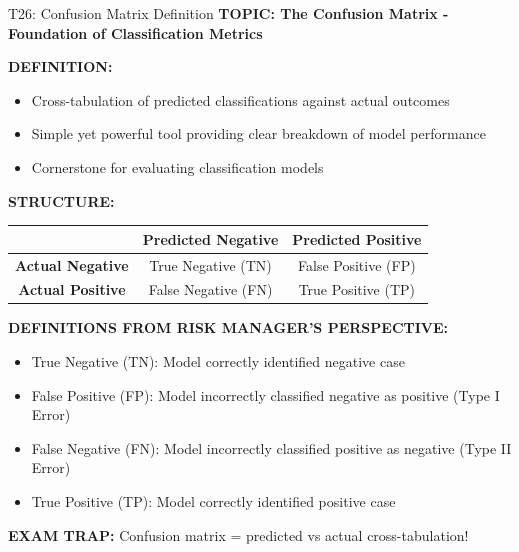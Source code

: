 \documentclass[8pt]{beamer}
\begin{document}
	\begin{frame}{T26: Confusion Matrix Definition}
		\fontsize{6.5}{7.5}\selectfont
		\textbf{TOPIC: The Confusion Matrix - Foundation of Classification Metrics}
		
		\vspace{0.1cm}
		\textbf{DEFINITION:}
		\begin{itemize}
			\item Cross-tabulation of predicted classifications against actual outcomes
			\item Simple yet powerful tool providing clear breakdown of model performance
			\item Cornerstone for evaluating classification models
		\end{itemize}
		
		\vspace{0.1cm}
		\textbf{STRUCTURE:}
		
		\begin{tabular}{|c|c|c|}
			\hline
			& \textbf{Predicted Negative} & \textbf{Predicted Positive} \\
			\hline
			\textbf{Actual Negative} & True Negative (TN) & False Positive (FP) \\
			\hline
			\textbf{Actual Positive} & False Negative (FN) & True Positive (TP) \\
			\hline
		\end{tabular}
		
		\vspace{0.1cm}
		\textbf{DEFINITIONS FROM RISK MANAGER'S PERSPECTIVE:}
		\begin{itemize}
			\item \textcolor{myblue}{True Negative (TN):} Model correctly identified negative case
			\item \textcolor{myblue}{False Positive (FP):} Model incorrectly classified negative as positive (Type I Error)
			\item \textcolor{myblue}{False Negative (FN):} Model incorrectly classified positive as negative (Type II Error)
			\item \textcolor{myblue}{True Positive (TP):} Model correctly identified positive case
		\end{itemize}
		
		\textcolor{myred}{\textbf{EXAM TRAP:}} Confusion matrix = \textcolor{myblue}{predicted vs actual} cross-tabulation!
	\end{frame}
	
\end{document}
